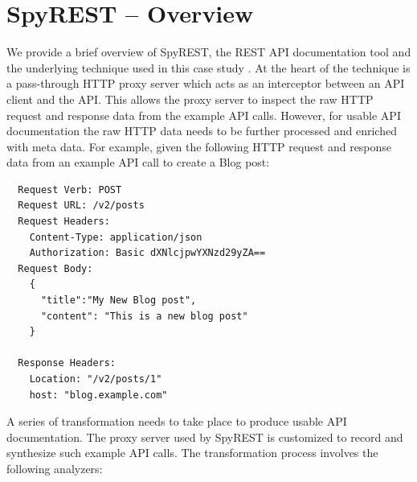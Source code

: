 \section{SpyREST -- Overview} %
\label{sec:overview}
We provide a brief overview of SpyREST, the REST API documentation tool and the underlying technique used in this case study \cite{DBLP:conf/kbse/SohanAM15, DBLP:conf/kbse/SohanAM15a}. At the heart of the technique is a pass-through HTTP proxy server which acts as an interceptor between an API client and the API. This allows the proxy server to inspect the raw HTTP request and response data from the example API calls. However, for usable API documentation the raw HTTP data needs to be further processed and enriched with meta data. For example, given the following HTTP request and response data from an example API call to create a Blog post:
\begin{lstlisting}
  Request Verb: POST
  Request URL: /v2/posts
  Request Headers:
    Content-Type: application/json
    Authorization: Basic dXNlcjpwYXNzd29yZA==
  Request Body:
    {
      "title":"My New Blog post",
      "content": "This is a new blog post"
    }

  Response Headers:
    Location: "/v2/posts/1"
    host: "blog.example.com"

\end{lstlisting}

A series of transformation needs to take place to produce usable API documentation. The proxy server used by SpyREST is customized to record and synthesize such example API calls. The transformation process involves the following analyzers:

